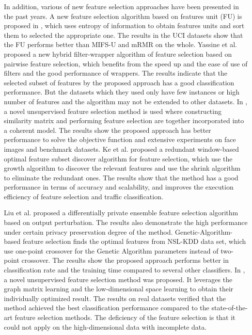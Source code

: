 \documentclass{ieeeaccess}
\theoremstyle{definition}
\begin{document}
In addition, various of new feature selection approaches have been presented in the past years. A new feature selection algorithm based on features unit (FU) is proposed in \cite{Wu2017}, which uses entropy of information to obtain features units and sort them to selected the appropriate one. The results in the UCI datasets show that the FU performs better than MIFS-U and mRMR on the whole. Yassine et al.\cite{Yassine2017} proposed a new hybrid filter-wrapper algorithm of feature selection based on pairwise feature selection, which benefits from the speed up and the ease of use of filters and the good performance of wrappers. The results indicate that the selected subset of features by the proposed approach has a good classification performance. But the datasets which they used only have few instances or high number of features and the algorithm may not be extended to other datasets.  In \cite{Yang2018a}, a novel unsupervised feature selection method is used where constructing similarity matrix and performing feature selection are together incorporated into a coherent model. The results show the proposed approach has better performance to solve the objective function and extensive experiments on face images and benchmark datasets. Ke et al.\cite{Ke2018} proposed a redundant window-based optimal feature subset discover algorithm for feature selection, which use the growth algorithm to discover the relevant features and use the shrink algorithm to eliminate the redundant ones. The results show that the method has a good performance in terms of accuracy and scalability, and improves the execution efficiency of feature selection and traffic classification.

Liu et al.\cite{Liu2018} proposed a differentially private ensemble feature selection algorithm based on output perturbation. The results also demonstrate the high performance under certain privacy preservation degree of the method. Genetic-Algorithm-based feature selection \cite{Ferriyan2017} finds the optimal features from NSL-KDD data set, which use one-point crossover for the Genetic Algorithm parameters instead of two-point crossover. The results show the proposed approach performs better in classification rate and the training time compared to several other classifiers. In \cite{Han2020}, a novel unsupervised feature selection method was proposed. It leverages the graph matrix learning and the low-dimensional space learning to obtain their individually optimized result. The results on real datasets verified that the method achieved the best classification performance compared to the state-of-the-art feature selection methods. The deficiency of the feature selection is that it could not apply on the high-dimensional data with incomplete data. 
\end{document}
